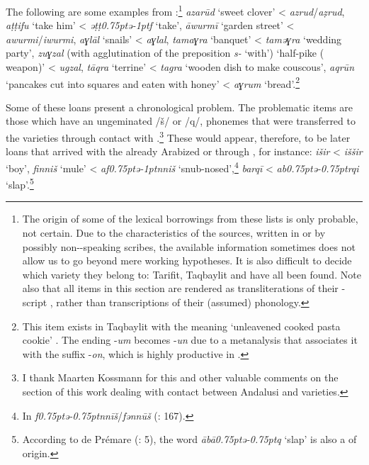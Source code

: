 \documentclass[output=paper,modfonts,nonflat]{langsci/langscibook}
\begin{document}
The following are some examples from \citet{CorrientePereiraVicente2017}:\footnote{The  origin of some of the lexical borrowings from these lists is only probable, not certain. Due to the characteristics of the sources, written in  or  by possibly non--speaking scribes, the available information sometimes does not allow us to go beyond mere working hypotheses. It is also difficult to decide which  variety they belong to: Tarifit, Taqbaylit and  have all been found. Note also that all  items in this section are rendered as transliterations of their -script , rather than transcriptions of their (assumed) phonology.} \textit{azarūd} ‘sweet clover’ < \textit{azrud}/\textit{aẓrud}, \textit{aṭṭifu} ‘take him’ < \textit{ǝṭṭ\kern 0.75ptǝ\kern -1ptf} ‘take’, \textit{āwurmī} ‘garden street’ < \textit{awurmi}/\textit{iwurmi}, \textit{aɣlāl} ‘snails’ < \textit{aɣlal}, \textit{tamaɣra} ‘banquet’ < \textit{tamǝɣra} `wedding party', \textit{zuɣzal} ({with agglutination of the preposition} \textit{s-} ‘with’) ‘half-pike ( weapon)’ < \textit{ugzal}, \textit{tāqra} `terrine' < \textit{tagra} `wooden dish to make couscous’, \textit{aqrūn} ‘pancakes cut into squares and eaten with honey’ < \textit{aɣrum} ‘bread’.\footnote{This item exists in Taqbaylit with the meaning ‘unleavened cooked pasta cookie’ \citep{Dallet1982}. The ending -\textit{um} becomes -\textit{un} due to a metanalysis that associates it with the  suffix -\textit{on}, which is highly productive in .} 

Some of these loans present a chronological problem. The problematic items are those which have an ungeminated /š/ or /q/, phonemes that were transferred to the  varieties through contact with .\footnote{I thank Maarten Kossmann for this and other valuable comments on the section of this work dealing with contact between Andalusi  and  varieties.} These would appear, therefore, to be later loans that arrived with the  already Arabized or through  , for instance: \textit{išir} < \textit{iššir} ‘boy’, \textit{finniš} ‘mule’ < \textit{af\kern 0.75ptǝ\kern -1ptnniš} ‘snub-nosed’,\footnote{In   \textit{f\kern 0.75ptǝ\kern -0.75ptnnīš}/\textit{fənnūš} (\citealt{Prémare1998}: 167).}  \textit{barqī} < \textit{ab\kern 0.75ptǝ\kern -0.75ptrqi} ‘slap’.\footnote{According to de Prémare (\citeyear{Prémare1993}: 5), the   word \textit{ābā{\R}\kern 0.75ptǝ\kern -0.75ptq} ‘slap’ is also a  of  origin.}
\end{document}
